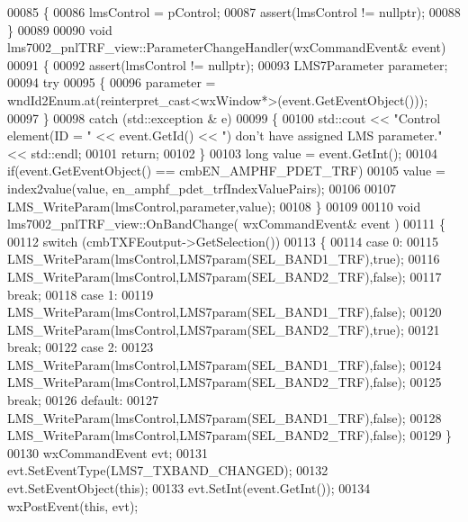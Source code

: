 \begin{DoxyCode}
{{{{00085 \{
00086     lmsControl = pControl;
00087     assert(lmsControl != \textcolor{keyword}{nullptr});
00088 \}
00089 
00090 \textcolor{keywordtype}{void} lms7002_pnlTRF_view::ParameterChangeHandler(wxCommandEvent& event)
00091 \{
00092     assert(lmsControl != \textcolor{keyword}{nullptr});
00093     LMS7Parameter parameter;
00094     \textcolor{keywordflow}{try}
00095     \{
00096         parameter = wndId2Enum.at(reinterpret\_cast<wxWindow*>(event.GetEventObject()));
00097     \}
00098     \textcolor{keywordflow}{catch} (std::exception & e)
00099     \{
00100         std::cout << \textcolor{stringliteral}{"Control element(ID = "} << \textcolor{keyword}{event}.GetId() << \textcolor{stringliteral}{") don't have assigned LMS parameter."} << 
      std::endl;
00101         \textcolor{keywordflow}{return};
00102     \}
00103     \textcolor{keywordtype}{long} value = \textcolor{keyword}{event}.GetInt();
00104     \textcolor{keywordflow}{if}(event.GetEventObject() == cmbEN_AMPHF_PDET_TRF)
00105         value = index2value(value, en_amphf_pdet_trfIndexValuePairs);
00106 
00107     LMS_WriteParam(lmsControl,parameter,value);
00108 \}
00109 
00110 \textcolor{keywordtype}{void} lms7002_pnlTRF_view::OnBandChange( wxCommandEvent& event )
00111 \{
00112     \textcolor{keywordflow}{switch} (cmbTXFEoutput->GetSelection())
00113     \{
00114     \textcolor{keywordflow}{case} 0:
00115         LMS_WriteParam(lmsControl,LMS7param(SEL_BAND1_TRF),\textcolor{keyword}{true});
00116         LMS_WriteParam(lmsControl,LMS7param(SEL_BAND2_TRF),\textcolor{keyword}{false});
00117         \textcolor{keywordflow}{break};
00118     \textcolor{keywordflow}{case} 1:
00119         LMS_WriteParam(lmsControl,LMS7param(SEL_BAND1_TRF),\textcolor{keyword}{false});
00120         LMS_WriteParam(lmsControl,LMS7param(SEL_BAND2_TRF),\textcolor{keyword}{true});
00121         \textcolor{keywordflow}{break};
00122     \textcolor{keywordflow}{case} 2:
00123         LMS_WriteParam(lmsControl,LMS7param(SEL_BAND1_TRF),\textcolor{keyword}{false});
00124         LMS_WriteParam(lmsControl,LMS7param(SEL_BAND2_TRF),\textcolor{keyword}{false});
00125         \textcolor{keywordflow}{break};
00126     \textcolor{keywordflow}{default}:
00127         LMS_WriteParam(lmsControl,LMS7param(SEL_BAND1_TRF),\textcolor{keyword}{false});
00128         LMS_WriteParam(lmsControl,LMS7param(SEL_BAND2_TRF),\textcolor{keyword}{false});
00129     \}
00130     wxCommandEvent evt;
00131     evt.SetEventType(LMS7\_TXBAND\_CHANGED);
00132     evt.SetEventObject(\textcolor{keyword}{this});
00133     evt.SetInt(event.GetInt());
00134     wxPostEvent(\textcolor{keyword}{this}, evt);
}}}}
\end{DoxyCode}
